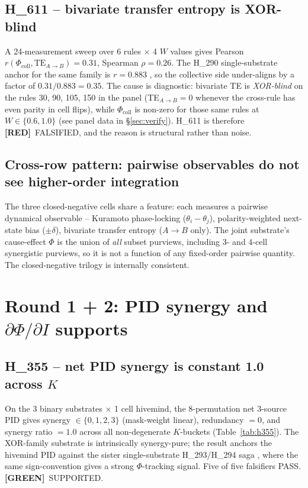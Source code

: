 \documentclass[11pt,a4paper]{article}
\providecommand{\tierGreen}{\textbf{[GREEN]}}
\providecommand{\tierRed}{\textbf{[RED]}}
\begin{document}
\subsection{H\_611 -- bivariate transfer entropy is XOR-blind}
\label{sec:h611}

A 24-measurement sweep over 6 rules $\times$ 4 $W$ values gives
Pearson $r(\Phi_{\mathrm{coll}}, \mathrm{TE}_{A\to B}) = 0.31$,
Spearman $\rho = 0.26$. The H\_290 single-substrate anchor for the
same family is $r = 0.883$ \citep{anima_H290}, so the collective
side under-aligns by a factor of $0.31/0.883 = 0.35$. The cause is
diagnostic: bivariate TE is \emph{XOR-blind} on the rules 30, 90,
105, 150 in the panel (TE$_{A\to B}=0$ whenever the cross-rule has
even parity in cell flips), while $\Phi_{\mathrm{coll}}$ is
non-zero for those same rules at $W \in \{0.6, 1.0\}$
(see panel data in \S\ref{sec:verify}). H\_611 is therefore
\tierRed\ FALSIFIED, and the reason is structural rather than noise.

\subsection{Cross-row pattern: pairwise observables do not see higher-order integration}

The three closed-negative cells share a feature: each measures a
pairwise dynamical observable -- Kuramoto phase-locking
($\theta_i - \theta_j$), polarity-weighted next-state bias
($\pm \delta$), bivariate transfer entropy ($A \to B$ only). The
joint substrate's cause-effect $\Phi$ is the
union of \emph{all} subset purviews, including 3- and
4-cell synergistic purviews, so it is not a function of any
fixed-order pairwise quantity. The closed-negative trilogy is
internally consistent.

\section{Round 1 + 2: PID synergy and $\partial\Phi/\partial I$ supports}
\label{sec:supports}

\subsection{H\_355 -- net PID synergy is constant 1.0 across $K$}

On the 3 binary substrates $\times$ 1 cell hivemind, the 8-permutation
net 3-source PID gives synergy $\in \{0, 1, 2, 3\}$ (mask-weight
linear), redundancy $= 0$, and synergy ratio $= 1.0$ across all
non-degenerate $K$-buckets (Table~\ref{tab:h355}). The XOR-family
substrate is intrinsically synergy-pure; the result anchors the
hivemind PID against the sister single-substrate
H\_293/H\_294 saga \citep{anima_H293,anima_H294}, where the same
sign-convention gives a strong $\Phi$-tracking signal. Five of five
falsifiers PASS. \tierGreen\ SUPPORTED.
\end{document}
